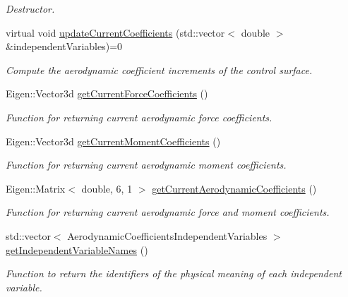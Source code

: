 \begin{DoxyCompactItemize}
\begin{DoxyCompactList}\small\item\em Destructor. \end{DoxyCompactList}\item 
virtual void \hyperlink{classtudat_1_1aerodynamics_1_1ControlSurfaceIncrementAerodynamicInterface_a50d3f4808de9cab082355ba42a9121cf}{update\+Current\+Coefficients} (std\+::vector$<$ double $>$ \&independent\+Variables)=0
\begin{DoxyCompactList}\small\item\em Compute the aerodynamic coefficient increments of the control surface. \end{DoxyCompactList}\item 
Eigen\+::\+Vector3d \hyperlink{classtudat_1_1aerodynamics_1_1ControlSurfaceIncrementAerodynamicInterface_a9a61e5e0e6d382c6831cbe47b7bbe16d}{get\+Current\+Force\+Coefficients} ()
\begin{DoxyCompactList}\small\item\em Function for returning current aerodynamic force coefficients. \end{DoxyCompactList}\item 
Eigen\+::\+Vector3d \hyperlink{classtudat_1_1aerodynamics_1_1ControlSurfaceIncrementAerodynamicInterface_a341c2c3abdd8c8720dd8c9aaf558c847}{get\+Current\+Moment\+Coefficients} ()
\begin{DoxyCompactList}\small\item\em Function for returning current aerodynamic moment coefficients. \end{DoxyCompactList}\item 
Eigen\+::\+Matrix$<$ double, 6, 1 $>$ \hyperlink{classtudat_1_1aerodynamics_1_1ControlSurfaceIncrementAerodynamicInterface_ac0c849aaef1ea3191be6a4bff68a5e1e}{get\+Current\+Aerodynamic\+Coefficients} ()
\begin{DoxyCompactList}\small\item\em Function for returning current aerodynamic force and moment coefficients. \end{DoxyCompactList}\item 
std\+::vector$<$ Aerodynamic\+Coefficients\+Independent\+Variables $>$ \hyperlink{classtudat_1_1aerodynamics_1_1ControlSurfaceIncrementAerodynamicInterface_a4de28c86ae40212514d2dcec8eb2ec64}{get\+Independent\+Variable\+Names} ()
\begin{DoxyCompactList}\small\item\em Function to return the identifiers of the physical meaning of each independent variable. \end{DoxyCompactList}\item 

\end{DoxyCompactItemize}
